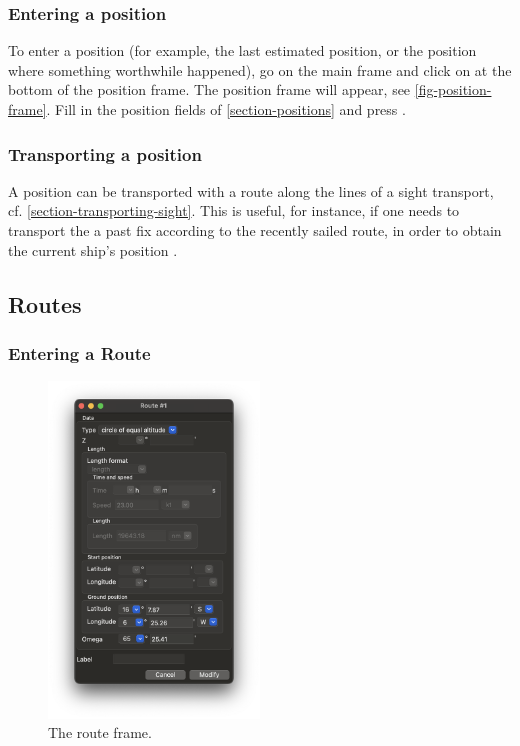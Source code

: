 \documentclass{ol-softwaremanual}
\begin{document}
\subsubsection{Entering a position}\label{section-enter-position}

To enter a position  (for example, the last estimated position, or the position where something worthwhile happened), go on the main frame and click on  at the bottom of the position frame. The position frame will appear, see \cref{fig-position-frame}. Fill in the position fields of \cref{section-positions} and press . 

\subsubsection{Transporting a position}\label{section-transport-position}

A position can be transported with a route along the lines of a \gls{sight} transport, cf. \cref{section-transporting-sight}. This is useful, for instance, if one needs to transport the a past fix according to the recently sailed route, in order to obtain the current ship's position \cite{bowditch2002the}. 


\subsection{Routes}\label{section-routes}

\subsubsection{Entering a Route}\label{section-entering-route}

\begin{figure}
  \includegraphics[width=0.5\textwidth]{figures/route-frame.png}
  \caption{
    \label{fig-route-frame}
    The route frame.  
  }
\end{figure}
\end{document}
